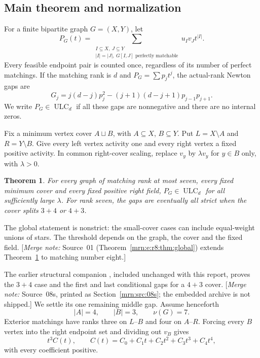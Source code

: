 \documentclass[11pt,a4paper]{article}
\newtheorem{theorem}{Theorem}[section]
\theoremstyle{remark}\newtheorem{remark}[theorem]{Remark}
\newcommand{\ULC}{\operatorname{ULC}}      %
\newcommand{\mnote}[1]{[\textit{Merge note:} #1]}
\begin{document}
\subsection{Main theorem and normalization}
For a finite bipartite graph $G=(X,Y)$, let
\[
 P_G(t)=\sum_{\substack{I\subseteq X,\ J\subseteq Y\\|I|=|J|,\ G[I,J]\text{ perfectly matchable}}}u_Iv_Jt^{|I|}.
\]
Every feasible endpoint pair is counted once, regardless of its number of perfect matchings. If the matching rank is $d$ and $P_G=\sum p_jt^j$, the actual-rank Newton gaps are
\begin{equation}\label{mrn:e:r7:eq:gaps}
 G_j=j(d-j)p_j^2-(j+1)(d-j+1)p_{j-1}p_{j+1}.
\end{equation}
We write $P_G\in\ULC_d$ if all these gaps are nonnegative and there are no internal zeros.

Fix a minimum vertex cover $A\sqcup B$, with $A\subseteq X$, $B\subseteq Y$. Put $L=X\setminus A$ and $R=Y\setminus B$. Give every left vertex activity one and every right vertex a fixed positive activity. In common right-cover scaling, replace $v_y$ by $\lambda v_y$ for $y\in B$ only, with $\lambda>0$.

\begin{theorem}\label{mrn:e:r7:thm:global}
For every graph of matching rank at most seven, every fixed minimum cover and every fixed positive right field, $P_G\in\ULC_d$ for all sufficiently large $\lambda$. For rank seven, the gaps are eventually all strict when the cover splits $3+4$ or $4+3$.
\end{theorem}
The global statement is nonstrict: the small-cover cases can include equal-weight unions of stars. The threshold depends on the graph, the cover and the fixed field. \mnote{Source~01 (Theorem~\ref{mrn:e:r8:thm:global}) extends Theorem~\ref{mrn:e:r7:thm:global} to matching number eight.}

The earlier structural companion \cite{b:m08s}, included unchanged with this report, proves the $3+4$ case and the first and last conditional gaps for a $4+3$ cover. \mnote{Source~08s, printed as Section~\ref{mrn:src:08s}; the embedded archive is not shipped.} We settle its one remaining middle gap. Assume henceforth
\[
 |A|=4,\qquad |B|=3,\qquad \nu(G)=7.
\]
Exterior matchings have ranks three on $L$--$B$ and four on $A$--$R$. Forcing every $B$ vertex into the right endpoint set and dividing out $v_B$ gives
\begin{equation}\label{mrn:e:r7:eq:C}
 t^3C(t),\qquad C(t)=C_0+C_1t+C_2t^2+C_3t^3+C_4t^4,
\end{equation}
with every coefficient positive.
\end{document}
